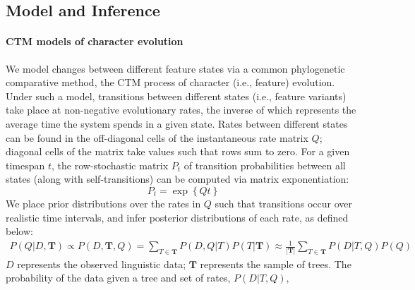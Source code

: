 \documentclass[11pt]{article}
\begin{document}
\subsection{Model and Inference}
\paragraph{CTM models of character evolution}
We model changes between different feature states via a common phylogenetic comparative method, the 
CTM 
process of character (i.e., feature) evolution.
Under such a model, transitions between different states (i.e., feature variants) take place at non-negative evolutionary {\sc rates}, the inverse of which represents the average time the system spends in a given state.
Rates between different states can be found in the off-diagonal cells of the instantaneous rate matrix $Q$; diagonal cells of the matrix take values such that rows sum to zero.
For a given timespan $t$, the row-stochastic matrix $P_t$ of transition {\sc probabilities} between all states (along with self-transitions) can be computed via matrix exponentiation:
$$
P_t = \exp\left\{{Qt}\right\}
$$
We place prior distributions over the rates in $Q$ such that transitions occur over realistic time intervals, and infer posterior distributions of each rate, as defined below:
\begin{equation}
\begin{aligned}
P(Q|D,\boldsymbol T) \propto P(D,\boldsymbol T,Q) = \sum_{T \in \boldsymbol T} P(D,Q|T) P(T|\boldsymbol T) \approx \frac{1}{|\boldsymbol T|} \sum_{T \in \boldsymbol T} P(D|T,Q) P(Q)
\end{aligned}
\label{posterior}
\end{equation}
$D$ represents the observed linguistic data; $\boldsymbol T$ represents the sample of trees. The probability of the data given a tree and set of rates, $P(D|T,Q)$, 
\end{document}
